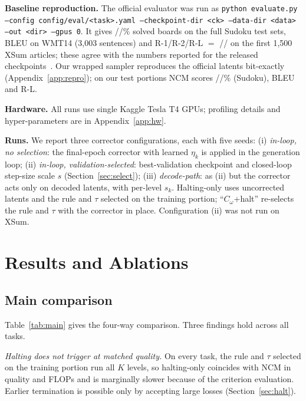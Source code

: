 \textbf{Baseline reproduction.} The official evaluator was run as \texttt{python evaluate.py --config config/eval/<task>.yaml --checkpoint-dir <ck> --data-dir <data> --out <dir> --gpus 0}. It gives \OffEasy/\OffMedium/\OffHard\% solved boards on the full Sudoku test sets, \OffWmt{} BLEU on WMT14 (3{,}003 sentences) and R-1/R-2/R-L $=$ \OffXsumRone/\OffXsumRtwo/\OffXsumRL{} on the first 1{,}500 XSum articles; these agree with the numbers reported for the released checkpoints~\citep{kumbong2026ncm}. Our wrapped sampler reproduces the official latents bit-exactly (Appendix~\ref{app:repro}); on our test portions NCM scores \BaseEasy/\BaseMedium/\BaseHard\% (Sudoku), \BaseWmt{} BLEU and \BaseXsum{} R-L.





\textbf{Hardware.} All runs use single Kaggle Tesla T4 GPUs; profiling details and hyper-parameters are in Appendix~\ref{app:hw}.

\textbf{Runs.} We report three corrector configurations, each with five seeds: (i) \emph{in-loop, no selection}: the final-epoch corrector with learned $\eta_k$ is applied in the generation loop; (ii) \emph{in-loop, validation-selected}: best-validation checkpoint and closed-loop step-size scale $s$ (Section~\ref{sec:select}); (iii) \emph{decode-path}: as (ii) but the corrector acts only on decoded latents, with per-level $s_k$. Halting-only uses uncorrected latents and the rule and $\tau$ selected on the training portion; ``$C_\omega$+halt'' re-selects the rule and $\tau$ with the corrector in place. Configuration (ii) was not run on XSum.

\section{Results and Ablations}
\label{sec:results}


\subsection{Main comparison}
Table~\ref{tab:main} gives the four-way comparison. Three findings hold across all tasks.

\textit{Halting does not trigger at matched quality.} On every task, the rule and $\tau$ selected on the training portion run all $K$ levels, so halting-only coincides with NCM in quality and FLOPs and is marginally slower because of the criterion evaluation. Earlier termination is possible only by accepting large losses (Section~\ref{sec:halt}).

